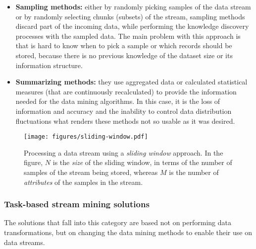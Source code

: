 \begin{itemize}
	\item \textbf{Sampling methods:} either by randomly picking samples of the data stream or by randomly selecting chunks (subsets) of the stream, sampling methods discard part of the incoming data, while performing the knowledge discovery processes with the sampled data. The main problem with this approach is that is hard to know when to pick a sample or which records should be stored, because there is no previous knowledge of the dataset size or its information structure.

	\item \textbf{Summarizing methods:} they use aggregated data or calculated statistical measures (that are continuously recalculated) to provide the information needed for the data mining algorithms. In this case, it is the loss of information and accuracy and the inability to control data distribution fluctuations what renders these methods not so usable as it was desired.
\end{itemize}

\begin{figure}
\centering
\texttt{[image: figures/sliding-window.pdf]}
\caption{Processing a data stream using a \textit{sliding window} approach. In the figure, $N$ is the \textit{size} of the sliding window, in terms of the number of samples of the stream being stored, whereas $M$ is the number of \textit{attributes} of the samples in the stream.}
\label{fig:sliding-window}
\end{figure}

\subsubsection*{Task-based stream mining solutions}

The solutions that fall into this category are based not on performing data transformations, but on changing the data mining methods to enable their use on data streams.

